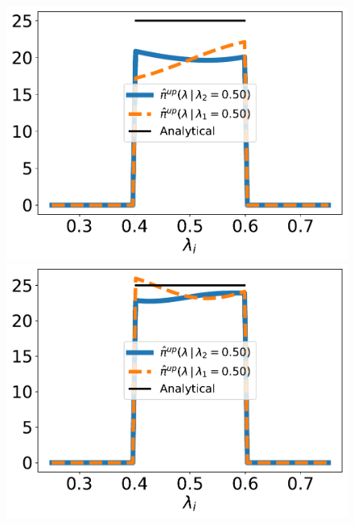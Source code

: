 \begin{figure}[ht]
\centering
	\begin{minipage}{.315\textwidth}
		\includegraphics[width=\linewidth]{./examples/identity/samp/identity_1d_conditionals_50E-2_N100_approx.pdf}
	\end{minipage}
	\begin{minipage}{.315\textwidth}
		\includegraphics[width=\linewidth]{./examples/identity/samp/identity_1d_conditionals_50E-2_N1000_approx.pdf}
	\end{minipage}
  \begin{minipage}{.315\textwidth}

\end{minipage}
\end{figure}
